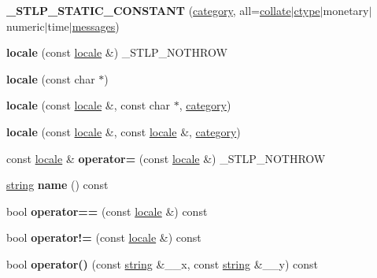 \begin{DoxyCompactItemize}
{\bfseries \+\_\+\+S\+T\+L\+P\+\_\+\+S\+T\+A\+T\+I\+C\+\_\+\+C\+O\+N\+S\+T\+A\+NT} (\hyperlink{structcategory}{category}, all=\hyperlink{classcollate}{collate}$\vert$\hyperlink{classctype}{ctype}$\vert$monetary$\vert$numeric$\vert$time$\vert$\hyperlink{classmessages}{messages})
\item 
\mbox{\label{classlocale_a9cc76cd7742d53535b46a685917b5db9}} 
{\bfseries locale} (const \hyperlink{classlocale}{locale} \&) \+\_\+\+S\+T\+L\+P\+\_\+\+N\+O\+T\+H\+R\+OW
\item 
\mbox{\label{classlocale_a7536afd334fa0597421a3afd6384bdbf}} 
{\bfseries locale} (const char $\ast$)
\item 
\mbox{\label{classlocale_abc48fee80fd4172fda29e9ef721d77dc}} 
{\bfseries locale} (const \hyperlink{classlocale}{locale} \&, const char $\ast$, \hyperlink{structcategory}{category})
\item 
\mbox{\label{classlocale_a6206db2d753006af661ee8eba777cff9}} 
{\bfseries locale} (const \hyperlink{classlocale}{locale} \&, const \hyperlink{classlocale}{locale} \&, \hyperlink{structcategory}{category})
\item 
\mbox{\label{classlocale_a942df4b67b6282212f94a0334be65c66}} 
const \hyperlink{classlocale}{locale} \& {\bfseries operator=} (const \hyperlink{classlocale}{locale} \&) \+\_\+\+S\+T\+L\+P\+\_\+\+N\+O\+T\+H\+R\+OW
\item 
\mbox{\label{classlocale_ac3f5649de01240c3eff291111fd74d3b}} 
\hyperlink{structstring}{string} {\bfseries name} () const
\item 
\mbox{\label{classlocale_a7efc6a9b92ff619bb7a761ef6fb9baab}} 
bool {\bfseries operator==} (const \hyperlink{classlocale}{locale} \&) const
\item 
\mbox{\label{classlocale_a112429360d0ac0ff91e4c61203eb727a}} 
bool {\bfseries operator!=} (const \hyperlink{classlocale}{locale} \&) const
\item 
\mbox{\label{classlocale_a5afe78fb443e5afe74c19126d083cb02}} 
bool {\bfseries operator()} (const \hyperlink{structstring}{string} \&\+\_\+\+\_\+x, const \hyperlink{structstring}{string} \&\+\_\+\+\_\+y) const

\end{DoxyCompactItemize}
